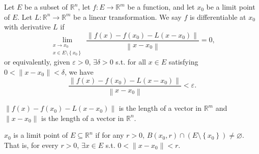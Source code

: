 \begin{definition}[Differentiability]
    Let \(E\) be a subset of \(\mathbb{R} ^n\), let \(f: E \to \mathbb{R} ^m\) be a function, and let \(x_0\) be a limit point of \(E\). Let \(L: \mathbb{R} ^n \to \mathbb{R} ^m\) be a linear transformation. We say \(f\) is differentiable at \(x_0\) with derivative \(L\) if 
    \[
        \lim_{\substack{x \to x_0 \\ x \in E \setminus \left\{ x_0 \right\} }} \frac{\left\lVert f(x) - f(x_0) - L(x - x_0) \right\rVert }{\left\lVert x - x_0 \right\rVert } = 0,
    \]         
    or equivalently, given \(\varepsilon > 0\), \(\exists \delta > 0\) s.t. for all \(x \in E\) satisfying \(0 < \lVert x - x_0 \rVert < \delta  \), we have 
    \[
       \frac{\left\lVert f(x) - f(x_0) - L(x - x_0) \right\rVert }{\left\lVert x - x_0 \right\rVert } < \varepsilon. 
    \]    
\end{definition}

\begin{remark}
    \(\lVert f(x) - f(x_0) - L(x - x_0) \rVert \) is the length of a vector in \(\mathbb{R} ^m\) and \(\lVert x - x_0 \rVert \) is the length of a vector in \(\mathbb{R} ^n\).    
\end{remark}

\begin{remark}
    \(x_0\) is a limit point of \(E \subseteq \mathbb{R} ^n\) if for any \(r > 0\), \(B(x_0, r) \cap \left( E \setminus \left\{ x_0 \right\}  \right) \neq \varnothing  \). That is, for every \(r > 0\), \(\exists x \in E\) s.t. \(0 < \lVert x - x_0 \rVert < r \).       
\end{remark}

